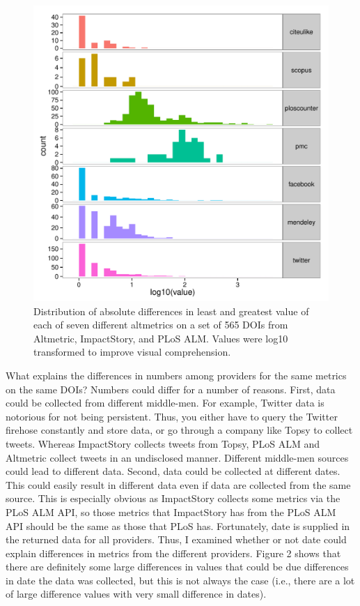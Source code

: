 \documentclass[letterpaper,superscriptaddress,showkeys,longbibliography]{revtex4-1}\usepackage{graphicx, color}
\newenvironment{knitrout}{}{} %
\begin{document}
\begin{knitrout}
\color{fgcolor}\begin{figure}[]


{\centering \includegraphics[width=.7\linewidth]{figure/dataconst_plot1} 

}

\caption[Distribution of absolute differences in least and greatest value of each of seven different altmetrics on a set of 565 DOIs from Altmetric, ImpactStory, and PLoS ALM]{Distribution of absolute differences in least and greatest value of each of seven different altmetrics on a set of 565 DOIs from Altmetric, ImpactStory, and PLoS ALM. Values were log10 transformed to improve visual comprehension.\label{fig:dataconst_plot1}}
\end{figure}


\end{knitrout}


What explains the differences in numbers among providers for the same metrics on the same DOIs? Numbers could differ for a number of reasons. First, data could be collected from different middle-men. For example, Twitter data is notorious for not being persistent. Thus, you either have to query the Twitter firehose constantly and store data, or go through a company like Topsy to collect tweets. Whereas ImpactStory collects tweets from Topsy, PLoS ALM and Altmetric collect tweets in an undisclosed manner. Different middle-men sources could lead to different data. Second, data could be collected at different dates. This could easily result in different data even if data are collected from the same source. This is especially obvious as ImpactStory collects some metrics via the PLoS ALM API, so those metrics that ImpactStory has from the PLoS ALM API should be the same as those that PLoS has. Fortunately, date is supplied in the returned data for all providers. Thus, I examined whether or not date could explain differences in metrics from the different providers. Figure 2 shows that there are definitely some large differences in values that could be due differences in date the data was collected, but this is not always the case (i.e., there are a lot of large difference values with very small difference in dates). 
\end{document}
